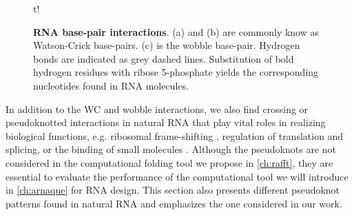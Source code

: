 \begin{figure}{t!}
	\caption{\textbf{\ac{RNA} base-pair interactions}. (a) and (b) are commonly know as Watson-Crick base-pairs. (c) is the wobble base-pair. Hydrogen bonds are indicated as grey dashed lines. Substitution of bold hydrogen residues with ribose 5-phosphate yields the corresponding nucleotides found in \ac{RNA} molecules.}\label{fig:basepairing}
\end{figure}

In addition to the \ac{WC} and wobble interactions, we also find crossing or pseudoknotted interactions in natural \ac{RNA} that play vital roles in realizing biological functions, e.g. ribosomal frame-shifting \cite{giedroc2000structure}, regulation of translation and splicing, or the binding of small molecules \cite{gilbert2008structure, klein2009cocrystal, spitale2009structural}. Although the pseudoknots are not considered in the computational folding tool we propose in \autoref{ch:rafft}, they are essential to evaluate the performance of the computational tool we will introduce in \autoref{ch:arnaque} for RNA design. This section also presents different pseudoknot patterns found in natural \ac{RNA} and emphasizes the one considered in our work.


